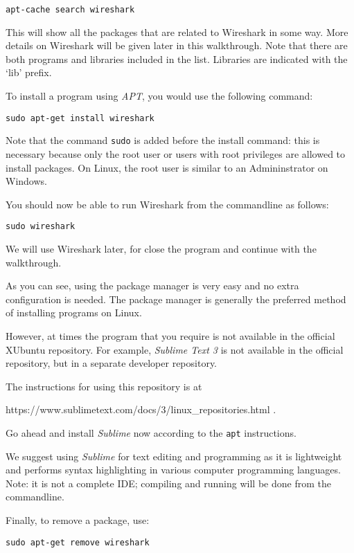 \documentclass[a4paper]{article}
\begin{document}
\begin{lstlisting}
apt-cache search wireshark
\end{lstlisting}

This will show all the packages that are related to Wireshark in some way. More details on Wireshark will be given later in this walkthrough. Note that there are both programs and libraries included in the list. Libraries are indicated with the `lib' prefix.

To install a program using \emph{APT}, you would use the following command: 
\begin{lstlisting}
sudo apt-get install wireshark
\end{lstlisting}

Note that the command \texttt{sudo} is added before the install command: this is necessary because only the root user or users with root privileges are allowed to install packages. On Linux, the root user is similar to an Admininstrator on Windows. 

You should now be able to run Wireshark from the commandline as follows:
\begin{lstlisting}
sudo wireshark
\end{lstlisting}

We will use Wireshark later, for close the program and continue with the walkthrough. 

As you can see, using the package manager is very easy and no extra configuration is needed. The package manager is generally the preferred method of installing programs on Linux. 

However, at times the program that you require is not available in the official XUbuntu repository. For example, \emph{Sublime Text 3} is not available in the official repository, but in a separate developer repository. 

The instructions for using this repository is at 

https://www.sublimetext.com/docs/3/linux\_repositories.html . 

Go ahead and install \emph{Sublime} now according to the \texttt{apt} instructions. 

We suggest using \emph{Sublime} for text editing and programming as it is lightweight and performs syntax highlighting in various computer programming languages. Note: it is not a complete IDE; compiling and running will be done from the commandline. 

Finally, to remove a package, use:

\begin{lstlisting}
sudo apt-get remove wireshark
\end{lstlisting}
\end{document}
